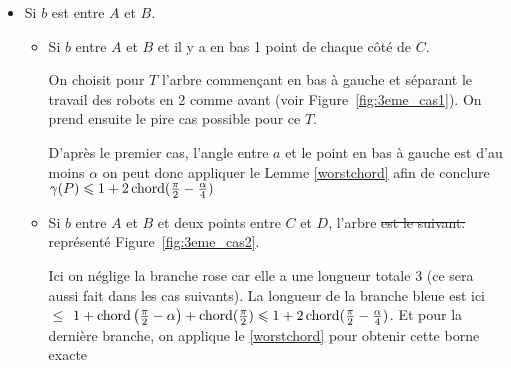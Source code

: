 \begin{itemize}

\item \label{3cas1} Si $b$ est entre $A$ et $B$.

\begin{itemize}

\item \label{3cas11} Si $b$ entre $A$ et $B$ et il y a en bas 1 point de chaque
  côté de $C$.

On choisit pour $T$ l'arbre commençant en bas à gauche et séparant le travail
des robots en 2 comme avant (voir Figure~\ref{fig:3eme_cas1}).
On prend ensuite le pire cas possible pour ce $T$.


D'après le premier cas, l'angle entre $a$ et le point en bas à gauche est d'au moins $\alpha$ on peut donc appliquer le Lemme \ref{worstchord} afin de conclure
$\gamma(P) \leqslant 1 + 2\operatorname{chord}(\frac{\pi}{2} - \frac{\alpha}{4})$

\item \label{3cas12} Si $b$ entre $A$ et $B$ et deux points entre $C$ et $D$,
   l'arbre \st{est le suivant:} représenté Figure~\ref{fig:3eme_cas2}.


Ici on néglige la branche rose car elle a une longueur totale  3 (ce sera
aussi fait dans les cas suivants). 
La longueur de la branche bleue est ici  \st{$\leq$} $1+\operatorname{chord}\left(\frac{\pi}{2} - \alpha\right)+\operatorname{chord}(\frac{\pi}{2}) \leqslant 1 + 2\operatorname{chord}(\frac{\pi}{2} - \frac{\alpha}{4})$.
Et pour la dernière branche, on applique le \cref{worstchord} pour obtenir
cette borne exacte


\end{itemize}
\end{itemize}
